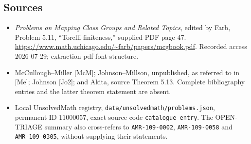 \documentclass[11pt]{article}
\begin{document}
\subsection{Sources}
\begin{itemize}
\item \emph{Problems on Mapping Class Groups and Related Topics}, edited by Farb, Problem 5.11, ``Torelli finiteness,'' supplied PDF page 47. \url{https://www.math.uchicago.edu/~farb/papers/mcgbook.pdf}. Recorded access 2026-07-29; extraction pdf-font-structure.
\item McCullough--Miller [McM]; Johnson--Millson, unpublished, as referred to in [Me]; Johnson [Jo2]; and Akita, source Theorem 5.13. Complete bibliography entries and the latter theorem statement are absent.
\item Local UnsolvedMath registry, \texttt{data/unsolvedmath/problems.json}, permanent ID \(11000057\), exact source code \texttt{catalogue entry}. The OPEN-TRIAGE summary also cross-refers to \texttt{AMR-109-0002}, \texttt{AMR-109-0058} and \texttt{AMR-109-0305}, without supplying their statements.
\end{itemize}
\end{document}
